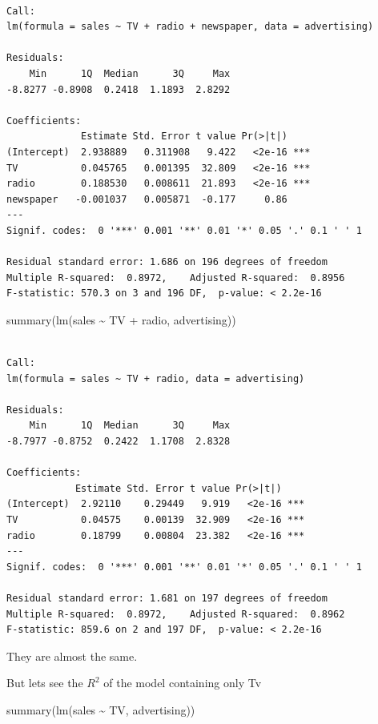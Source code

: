 \documentclass[
  letterpaper,
  DIV=11,
  numbers=noendperiod]{scrreprt}
\newenvironment{Shaded}{\begin{snugshade}}{\end{snugshade}}
\newcommand{\FunctionTok}[1]{\textcolor[rgb]{0.28,0.35,0.67}{#1}}
\newcommand{\NormalTok}[1]{\textcolor[rgb]{0.00,0.23,0.31}{#1}}
\newcommand{\SpecialCharTok}[1]{\textcolor[rgb]{0.37,0.37,0.37}{#1}}
\begin{document}
\begin{verbatim}

Call:
lm(formula = sales ~ TV + radio + newspaper, data = advertising)

Residuals:
    Min      1Q  Median      3Q     Max 
-8.8277 -0.8908  0.2418  1.1893  2.8292 

Coefficients:
             Estimate Std. Error t value Pr(>|t|)    
(Intercept)  2.938889   0.311908   9.422   <2e-16 ***
TV           0.045765   0.001395  32.809   <2e-16 ***
radio        0.188530   0.008611  21.893   <2e-16 ***
newspaper   -0.001037   0.005871  -0.177     0.86    
---
Signif. codes:  0 '***' 0.001 '**' 0.01 '*' 0.05 '.' 0.1 ' ' 1

Residual standard error: 1.686 on 196 degrees of freedom
Multiple R-squared:  0.8972,    Adjusted R-squared:  0.8956 
F-statistic: 570.3 on 3 and 196 DF,  p-value: < 2.2e-16
\end{verbatim}

\begin{Shaded}
\begin{Highlighting}[]
\FunctionTok{summary}\NormalTok{(}\FunctionTok{lm}\NormalTok{(sales }\SpecialCharTok{\textasciitilde{}}\NormalTok{ TV }\SpecialCharTok{+}\NormalTok{ radio, advertising))}
\end{Highlighting}
\end{Shaded}

\begin{verbatim}

Call:
lm(formula = sales ~ TV + radio, data = advertising)

Residuals:
    Min      1Q  Median      3Q     Max 
-8.7977 -0.8752  0.2422  1.1708  2.8328 

Coefficients:
            Estimate Std. Error t value Pr(>|t|)    
(Intercept)  2.92110    0.29449   9.919   <2e-16 ***
TV           0.04575    0.00139  32.909   <2e-16 ***
radio        0.18799    0.00804  23.382   <2e-16 ***
---
Signif. codes:  0 '***' 0.001 '**' 0.01 '*' 0.05 '.' 0.1 ' ' 1

Residual standard error: 1.681 on 197 degrees of freedom
Multiple R-squared:  0.8972,    Adjusted R-squared:  0.8962 
F-statistic: 859.6 on 2 and 197 DF,  p-value: < 2.2e-16
\end{verbatim}

They are almost the same.

But lets see the \(R^2\) of the model containing only Tv

\begin{Shaded}
\begin{Highlighting}[]
\FunctionTok{summary}\NormalTok{(}\FunctionTok{lm}\NormalTok{(sales }\SpecialCharTok{\textasciitilde{}}\NormalTok{ TV, advertising))}
\end{Highlighting}
\end{Shaded}
\end{document}
